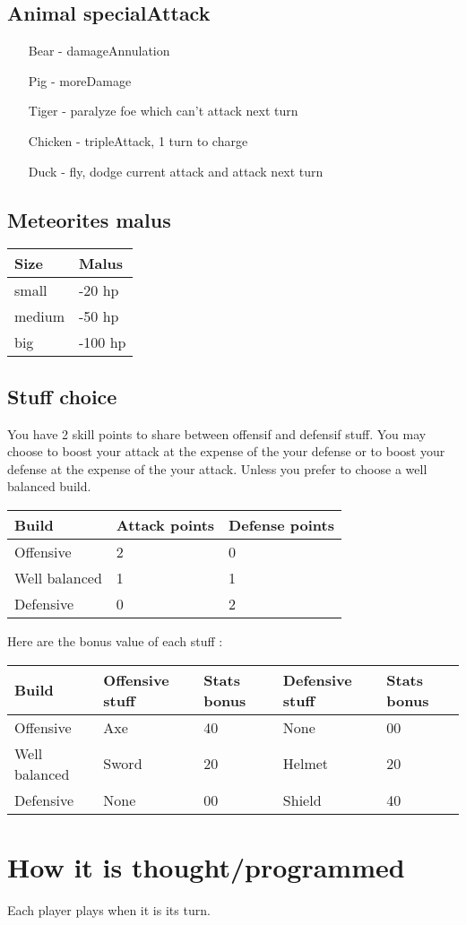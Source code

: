 \subsection{Animal specialAttack}

\begin{itemize}
 \item[Bear] - damageAnnulation
 \item[Pig] - moreDamage
 \item[Tiger] - paralyze foe which can't attack next turn
 \item[Chicken] - tripleAttack, 1 turn to charge
 \item[Duck] - fly, dodge current attack and attack next turn
\end{itemize}


\subsection{Meteorites malus}

\begin{tabular}{|R{3cm}|C{3cm}|}
\hline {} Size & Malus \\
\hline small & -20 hp\\
\hline medium & -50 hp \\
\hline big & -100 hp \\
\hline 
\end{tabular}


\subsection{Stuff choice}
You have 2 skill points to share between offensif and defensif stuff. 
You may choose to boost your attack at the expense of the your defense or to boost your defense at the expense of the your attack. 
Unless you prefer to choose a well balanced build.

\begin{tabular}{|R{3,5cm}|C{3cm}|C{3cm}|}
\hline {} Build & Attack points & Defense points  \\
\hline Offensive & 2 & 0 \\
\hline Well balanced & 1 & 1 \\
\hline Defensive & 0 & 2 \\
\hline 
\end{tabular}

Here are the bonus value of each stuff :

\begin{tabular}{|R{3,5cm}|C{3cm}|C{2cm}|C{3cm}|C{2cm}|}
\hline {} Build & Offensive stuff & Stats bonus & Defensive stuff & Stats bonus \\
\hline Offensive & Axe & 40 & None & 00 \\
\hline Well balanced & Sword & 20 & Helmet & 20 \\
\hline Defensive & None & 00 & Shield & 40 \\
\hline 
\end{tabular}

\section{How it is thought/programmed}

Each player plays when it is its turn.



